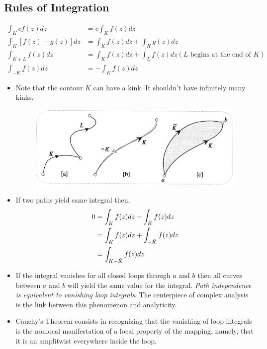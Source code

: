 \documentclass[12pt]{article}
\def\tt{\textit}
\def\td{\ensuremath\tilde}
\begin{document}
\subsection{Rules of Integration}
\begin{align*}
    \int_{K}c f(z) dz &= c \int_{K}f(z)dz\\
    \int_{K}[f(z)+g(z)]dz &= \int_{K}f(z)dz + \int_{K}g(z)dz\\
    \int_{K+L}f(z)dz &= \int_{K}f(z)dz + \int_{L}f(z)dz (L\text{ begins at the end of }K)\\
    \int_{-K}f(z)dz &= -\int_{K}f(z)dz
\end{align*}
\begin{itemize}
    \item Note that the contour $K$ can have a kink. It shouldn't have infinitely many kinks.
    \begin{figure}[h!]
        \centering
        \includegraphics[scale=0.7]{fig_4}
        \label{f4}
    \end{figure}
    \item If two paths yield same integral then,
    \begin{align*}
        0 &= \int_{K}f(z)dz-\int_{\td{K}}f(z)dz\\
        &= \int_{K}f(z)dz + \int_{-\td{K}}f(z)dz\\
        &= \int_{K-\td{K}}f(z)dz
    \end{align*}
    \item If the integral vanishes for all closed loops through $a$ and $b$ then all curves between $a$ and $b$ will yield the same value for the integral. \tt{Path independence is equivalent to vanishing loop integrals}. The centerpiece of complex analysis is the link between this phenomenon and analyticity.
    \item Cauchy's Theorem consists in recognizing that the vanishing of loop integrals is the nonlocal manifestation of a local property of the mapping, namely, that it is an amplitwist everywhere inside the loop.
\end{itemize}
\end{document}
